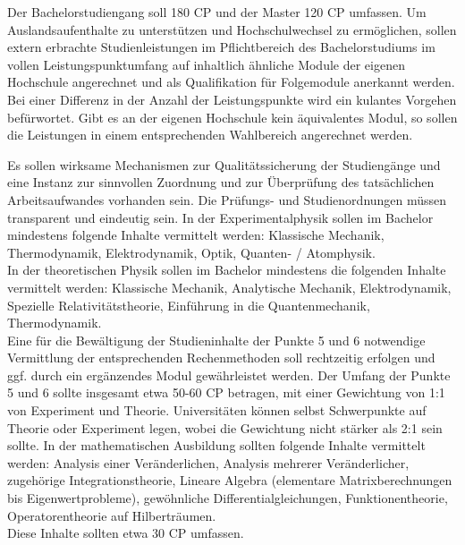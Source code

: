Der Bachelorstudiengang soll 180 CP und der Master 120 CP umfassen.
Um Auslandsaufenthalte zu unterstützen und Hochschulwechsel zu ermöglichen, sollen extern erbrachte Studienleistungen im Pflichtbereich des Bachelorstudiums im vollen Leistungspunktumfang auf inhaltlich ähnliche Module der eigenen Hochschule angerechnet und als Qualifikation für Folgemodule anerkannt werden. Bei einer Differenz in der Anzahl der Leistungspunkte wird ein kulantes Vorgehen befürwortet. Gibt es an der eigenen Hochschule kein äquivalentes Modul, so sollen die Leistungen in einem entsprechenden Wahlbereich angerechnet werden.

        Es sollen wirksame Mechanismen zur Qualitätssicherung der Studiengänge und eine Instanz zur sinnvollen Zuordnung und zur Überprüfung des tatsächlichen Arbeitsaufwandes vorhanden sein.
        Die Prüfungs- und Studienordnungen müssen transparent und eindeutig sein.
        In der Experimentalphysik sollen im Bachelor mindestens folgende Inhalte vermittelt werden:
            Klassische Mechanik,
            Thermodynamik,
            Elektrodynamik,
            Optik,
            Quanten- / Atomphysik.\\
        In der theoretischen Physik sollen im Bachelor mindestens die folgenden Inhalte vermittelt werden:
            Klassische Mechanik,
            Analytische Mechanik,
            Elektrodynamik,
            Spezielle Relativitätstheorie,
            Einführung in die Quantenmechanik,
            Thermodynamik.\\
        Eine für die Bewältigung der Studieninhalte der Punkte 5 und 6 notwendige Vermittlung der entsprechenden Rechenmethoden soll rechtzeitig erfolgen und ggf. durch ein ergänzendes Modul gewährleistet werden.
        Der Umfang der Punkte 5 und 6 sollte insgesamt etwa 50-60 CP betragen, mit einer Gewichtung von 1:1 von Experiment und Theorie. Universitäten können selbst Schwerpunkte auf Theorie oder Experiment legen, wobei die Gewichtung nicht stärker als 2:1 sein sollte.
        In der mathematischen Ausbildung sollten folgende Inhalte vermittelt werden:
            Analysis einer Veränderlichen,
            Analysis mehrerer Veränderlicher,
            zugehörige Integrationstheorie,
            Lineare Algebra (elementare Matrixberechnungen bis Eigenwertprobleme),
            gewöhnliche Differentialgleichungen,
            Funktionentheorie,
            Operatorentheorie auf Hilberträumen.\\

            Diese Inhalte sollten etwa 30 CP umfassen.\\

